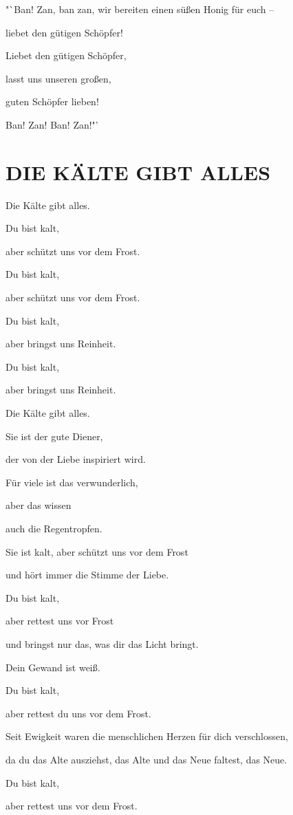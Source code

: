 \documentclass[11pt,a5paper,twoside]{article}
\begin{document}
"`Ban! Zan, ban zan, wir bereiten einen süßen Honig für euch --

liebet den gütigen Schöpfer! 

Liebet den gütigen Schöpfer,
 
lasst uns unseren großen, 

guten Schöpfer lieben!

Ban! Zan! Ban! Zan!"'

\section[Die Kälte gibt alles]{DIE KÄLTE GIBT ALLES}



Die Kälte gibt alles. 

Du bist kalt,

aber schützt uns vor dem Frost.

Du bist kalt,

aber schützt uns vor dem Frost.

Du bist kalt, 

aber bringst uns Reinheit.

Du bist kalt, 

aber bringst uns Reinheit.

Die Kälte gibt alles.

Sie ist der gute Diener,

der von der Liebe inspiriert wird.

Für viele ist das verwunderlich,

aber das wissen 

auch die Regentropfen.

Sie ist kalt, aber schützt uns vor dem Frost

und hört immer die Stimme der Liebe.

Du bist kalt,

aber rettest uns vor Frost

und bringst nur das, was dir das Licht bringt. 

Dein Gewand ist weiß.

Du bist kalt,

aber rettest du uns vor dem Frost.

Seit Ewigkeit waren die menschlichen Herzen für dich verschlossen,

da du das Alte ausziehst, das Alte und das Neue faltest, das Neue.

Du bist kalt,

aber rettest uns vor dem Frost.
\end{document}
